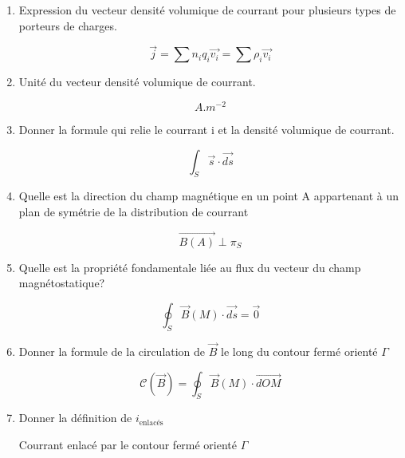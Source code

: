 \documentclass{article}
\begin{document}
\begin{enumerate}[label=\arabic{enumi} - , left=0pt, itemsep=1em]
    \item Expression du vecteur densité volumique de courrant pour plusieurs types de porteurs de charges.\par
    \begin{solution}
         \[ \vec{j} = \sum n_i q_i\vec{v_i} = \sum \rho_i\vec{v_i} \]
    \end{solution}

    \item Unité du vecteur densité volumique de courrant.\par
    \begin{solution}
         \[ A.m^{-2} \]
    \end{solution}

    \item Donner la formule qui relie le courrant i et la densité volumique de courrant.\par
    \begin{solution}
         \[ \int_S \vec{s} \cdot \vec{ds} \]
    \end{solution}

    \item Quelle est la direction du champ magnétique en un point A appartenant à un plan de symétrie de la distribution de courrant  \par
    \begin{solution}
         \[ \vec{B(A)} \perp \pi_S \]
    \end{solution}


    \item Quelle est la propriété fondamentale liée au flux du vecteur du champ magnétostatique?\par 
    \begin{solution}
         \[ \oint_S \vec{B}(M) \cdot \vec{ds} = \vec{0} \]
    \end{solution}

    \item Donner la formule de la circulation de $\vec{B}$ le long du contour fermé orienté $\Gamma$\par
    \begin{solution}
         \[ \mathscr{C}(\vec{B}) = \oint_S \vec{B}(M) \cdot \vec{dOM} \]
    \end{solution}

    \item Donner la définition de $i_{\text{enlacés}}$ \par
    \begin{solution}
         Courrant enlacé par le contour fermé orienté $\Gamma$
    \end{solution}


\end{enumerate}
\end{document}
